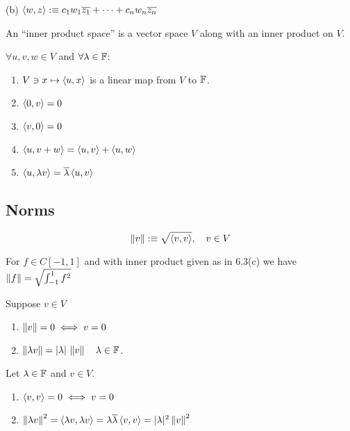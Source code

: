 \begin{example}
  (b) $\left \langle w, z \right \rangle :\equiv c_1 w_1 \overline{z_1} + \cdots + c_n w_n \overline{z_n}$
\end{example}

\begin{mydef}
  An ``inner product space'' is a vector space $V$ along with an inner product on $V$.
\end{mydef}

\setcounter{thm}{5}

\begin{thm}
  $\forall u,v,w \in V$ and $\forall \lambda \in \mathbb{F}$:  
  \begin{enumerate}[label=(\alph*)]
    \item $V \ni x \mapsto \left \langle u, x \right \rangle$ is a linear map from $V$ to $\mathbb{F}$.
    \item $\left \langle 0, v \right \rangle = 0 $
    \item $\left \langle v, 0 \right \rangle = 0$
    \item $\left \langle u, v+w \right \rangle = \left \langle u, v \right \rangle + \left \langle u, w \right \rangle $
    \item $\left \langle u, \lambda v \right \rangle = \overline{\lambda} \left \langle u, v \right \rangle$
  \end{enumerate}
\end{thm}

\subsection{Norms}

\begin{mydef} [norm]
  \begin{equation}
    \left \lVert v \right \rVert :\equiv \sqrt{\left \langle v, v \right \rangle}, \quad v \in  V
  \end{equation}
\end{mydef}

\begin{example}
  For $f \in C[-1,1]$ and with inner product given as in 6.3(c) we have $\left \lVert f \right \rVert = \sqrt { \int_{-1}^{1} f^2}$

\end{example}

\begin{thm} 
  Suppose $v \in V$
  \begin{enumerate}[label=(\alph*)]
    \item $\left \lVert v \right \rVert = 0 \iff v = 0$
    \item $\left \lVert \lambda v \right \rVert = |\lambda| \,\left \lVert v \right \rVert \quad \lambda \in \mathbb{F}$.
  \end{enumerate}
\end{thm}
\begin{prf}
  Let $\lambda \in \mathbb{F}$ and $v \in V$.
  \begin{enumerate}[label=(\alph*)]
    \item $\left \langle v, v \right \rangle = 0 \iff v=0$
    \item $\left \lVert \lambda v \right \rVert^2 = \left \langle \lambda v, \lambda v \right \rangle = \lambda \overline{\lambda} \left \langle v, v \right \rangle = |\lambda|^2 \left \lVert v \right \rVert^2$
  \end{enumerate}
\end{prf}

